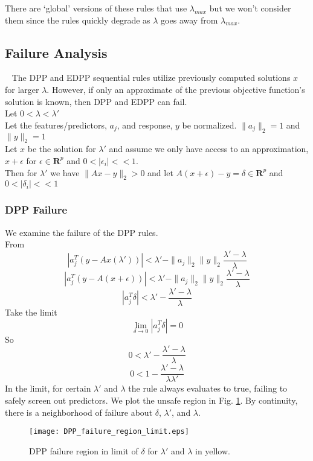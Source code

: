 \documentclass{article}
\begin{document}
There are `global' versions of these rules that use $\lambda_{max}$ but we won't consider them since the rules quickly degrade as $\lambda$ goes away from $\lambda_{max}$.



\subsection*{Failure Analysis}

\qquad ~ The DPP and EDPP sequential rules utilize previously computed solutions $x$ for larger $\lambda$. However, if only an approximate of the previous objective function's solution is known, then DPP and EDPP can fail.\\

Let $0<\lambda<\lambda'$ \\
Let the features/predictors, $a_j$, and response, $y$ be normalized. $\|a_j\|_2=1$ and $\|y\|_2=1$\\
Let $x$ be the solution for $\lambda'$ and assume we only have access to an approximation, $x+\epsilon$ for $\epsilon\in \mathbf R^p$ and $0<|\epsilon_i|<<1$. \\
Then for $\lambda'$ we have $\|Ax-y\|_2>0$ and let $A(x+\epsilon)-y = \delta \in \mathbf R^p$ and $0<|\delta_i|<<1$

\subsubsection*{DPP Failure}
We examine the failure of the DPP rules.\\
From
$$ |a_j^T (y - Ax(\lambda'))| < \lambda' - \|a_j\|_2 \|y\|_2 \frac{\lambda'-\lambda}{\lambda} $$
$$ |a_j^T (y - A(x+\epsilon))| < \lambda' - \|a_j\|_2 \|y\|_2 \frac{\lambda'-\lambda}{\lambda} $$
$$ |a_j^T \delta| < \lambda' - \frac{\lambda'-\lambda}{\lambda} $$
Take the limit
$$ \lim_{\delta \rightarrow 0} |a_j^T \delta| = 0$$
So
$$ 0 < \lambda' - \frac{\lambda'-\lambda}{\lambda} $$
$$ 0 < 1 - \frac{\lambda'-\lambda}{\lambda\lambda'} $$
In the limit, for certain $\lambda'$ and $\lambda$ the rule always evaluates to true, failing to safely screen out predictors. We plot the unsafe region in Fig. \ref{fig:DPP_failure_region_limit}. By continuity, there is a neighborhood of failure about $\delta$, $\lambda'$, and $\lambda$.

\begin{figure}
    \centering
    {\texttt{[image: DPP\_failure\_region\_limit.eps]} }
    \caption{DPP failure region in limit of $\delta$ for $\lambda'$ and $\lambda$ in yellow.}
	\label{fig:DPP_failure_region_limit}
\end{figure}
\end{document}
